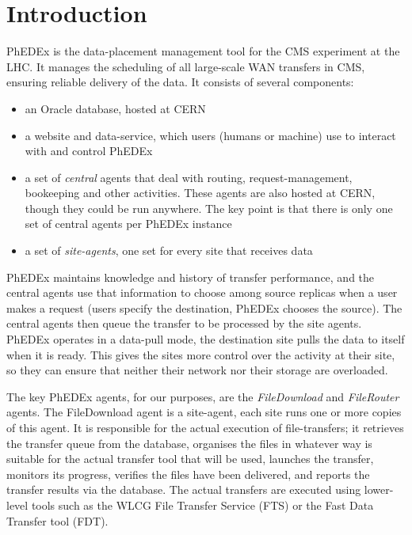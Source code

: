 \section{Introduction}
PhEDEx\cite{PhEDEx} is the data-placement management tool for the CMS\cite{CMS} experiment at the LHC. It manages the scheduling of all large-scale WAN transfers in CMS, ensuring reliable delivery of the data. It consists of several components:

\begin{itemize}
\item an Oracle database, hosted at CERN
\item a website and data-service, which users (humans or machine) use to interact with and control PhEDEx
\item a set of \emph{central} agents that deal with routing, request-management, bookeeping and other activities. These agents are also hosted at CERN, though they could be run anywhere. The key point is that there is only one set of central agents per PhEDEx instance
\item a set of \emph{site-agents}, one set for every site that receives data
\end{itemize}

PhEDEx maintains knowledge and history of transfer performance, and the central agents use that information to choose among source replicas when a user makes a request (users specify the destination, PhEDEx chooses the source). The central agents then queue the transfer to be processed by the site agents. PhEDEx operates in a data-pull mode, the destination site pulls the data to itself when it is ready. This gives the sites more control over the activity at their site, so they can ensure that neither their network nor their storage are overloaded.

The key PhEDEx agents, for our purposes, are the \emph{FileDownload} and \emph{FileRouter} agents. The FileDownload agent is a site-agent, each site runs one or more copies of this agent. It is responsible for the actual execution of file-transfers; it retrieves the transfer queue from the database, organises the files in whatever way is suitable for the actual transfer tool that will be used, launches the transfer, monitors its progress, verifies the files have been delivered, and reports the transfer results via the database. The actual transfers are executed using lower-level tools such as the WLCG File Transfer Service (FTS\cite{FTS}) or the Fast Data Transfer tool (FDT\cite{MonALISA}).

